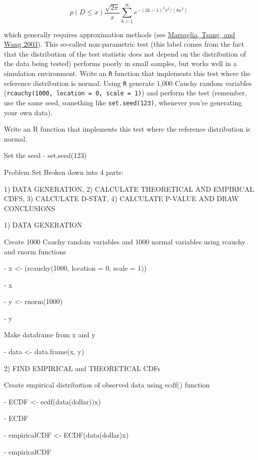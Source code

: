 \documentclass[12pt,letterpaper]{article}
\begin{document}
$$p(D \leq x) \frac{\sqrt {2\pi}}{x} \sum _{k=1}^{\infty }e^{-(2k-1)^{2}\pi ^{2}/(8x^{2})}$$


\noindent which generally requires approximation methods (see \href{https://core.ac.uk/download/pdf/25787785.pdf}{Marsaglia, Tsang, and Wang 2003}). This so-called non-parametric test (this label comes from the fact that the distribution of the test statistic does not depend on the distribution of the data being tested) performs poorly in small samples, but works well in a simulation environment. Write an \texttt{R} function that implements this test where the reference distribution is normal. Using \texttt{R} generate 1,000 Cauchy random variables (\texttt{rcauchy(1000, location = 0, scale = 1)}) and perform the test (remember, use the same seed, something like \texttt{set.seed(123)}, whenever you're generating your own data).
	
\vspace{5cm}
Write an R function that implements this test where the reference distribution is normal.

Set the seed
	- set.seed(123)

Problem Set Broken down into 4 parts: 
\vspace{1cm}

1) DATA GENERATION, 2) CALCULATE THEORETICAL AND EMPIRICAL CDFS, 3) CALCULATE D-STAT, 4) CALCULATE P-VALUE AND DRAW CONCLUSIONS 
\vspace{1cm}

1) DATA GENERATION

Create 1000 Cauchy random variables and 1000 normal variables using rcauchy and rnorm functions
	
	- x <- (rcauchy(1000, location = 0, scale = 1))

	- x

	- y <- rnorm(1000)

	- y

Make dataframe from x and y

	- data <- data.frame(x, y)
\vspace{1cm}

2) FIND EMPIRICAL and THEORETICAL CDFs

Create empirical distribution of observed data using ecdf() function
	
	-  ECDF <- ecdf(data(dollar))x) 

	- ECDF

	- empiricalCDF <- ECDF(data(dollar)x)

	- empiricalCDF
\end{document}
